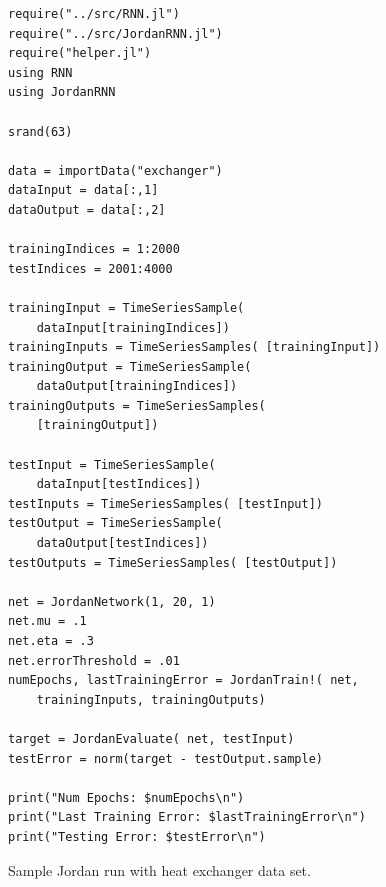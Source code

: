 \documentclass{acm_proc_article-sp}
\begin{document}
\begin{listing}
\begin{snugshade}
\begin{verbatim}
require("../src/RNN.jl")
require("../src/JordanRNN.jl")
require("helper.jl")
using RNN
using JordanRNN

srand(63)

data = importData("exchanger")
dataInput = data[:,1]
dataOutput = data[:,2]

trainingIndices = 1:2000
testIndices = 2001:4000

trainingInput = TimeSeriesSample( 
    dataInput[trainingIndices])
trainingInputs = TimeSeriesSamples( [trainingInput])
trainingOutput = TimeSeriesSample( 
    dataOutput[trainingIndices])
trainingOutputs = TimeSeriesSamples( 
    [trainingOutput])

testInput = TimeSeriesSample( 
    dataInput[testIndices])
testInputs = TimeSeriesSamples( [testInput])
testOutput = TimeSeriesSample( 
    dataOutput[testIndices])
testOutputs = TimeSeriesSamples( [testOutput])

net = JordanNetwork(1, 20, 1)
net.mu = .1
net.eta = .3
net.errorThreshold = .01
numEpochs, lastTrainingError = JordanTrain!( net, 
    trainingInputs, trainingOutputs)

target = JordanEvaluate( net, testInput)
testError = norm(target - testOutput.sample)

print("Num Epochs: $numEpochs\n")
print("Last Training Error: $lastTrainingError\n")
print("Testing Error: $testError\n")
\end{verbatim}
\end{snugshade}
\caption{Sample Jordan run with heat exchanger data set.}
\label{code:exchangerJordan}
\end{listing}
\end{document}
